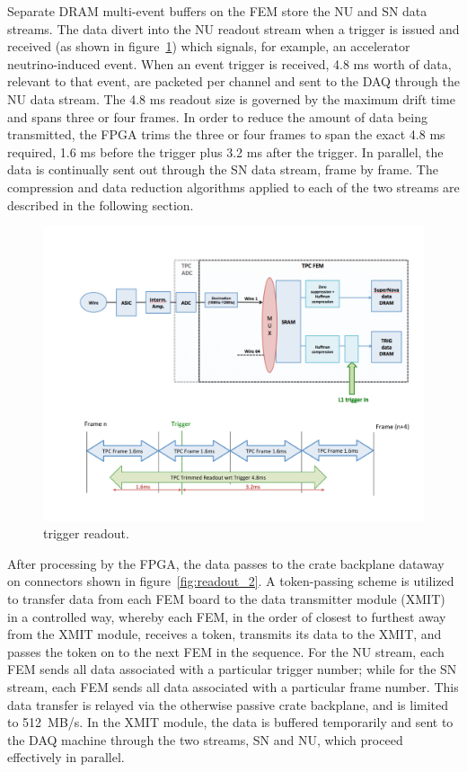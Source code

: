 Separate DRAM multi-event buffers on the FEM store the NU and SN data streams. The data divert into the NU readout stream when a trigger is issued and received (as shown in figure~\ref{fig:readout_4}) which signals, for example, an accelerator neutrino-induced event. When an event trigger is received, 4.8 ms worth of data, relevant to that event, are packeted per channel and sent to the DAQ through the NU data stream. The 4.8 ms readout size is governed by the maximum drift time and spans three or four frames. In order to reduce the amount of data being transmitted, the FPGA trims the three or four frames to span the exact 4.8 ms required, 1.6 ms before the trigger plus 3.2 ms after the trigger. In parallel, the data is continually sent out through the SN data stream, frame by frame. The compression and data reduction algorithms applied to each of the two streams are described in the following section.
 
\begin{figure}
\centering
\includegraphics[width=0.8\linewidth]{./figures/readout_4.pdf}%
\caption{\label{fig:readout_4}\lartpc trigger readout.}
\end{figure}

After processing by the FPGA, the data passes to the crate backplane dataway on connectors shown in figure~\ref{fig:readout_2}. A token-passing scheme is utilized to transfer data from each FEM board to the data transmitter module (XMIT) in a controlled way, whereby each FEM, in the order of closest to furthest away from the XMIT module, receives a token, transmits its data to the XMIT, and passes the token on to the next FEM in the sequence. For the NU stream, each FEM sends all data associated with a particular trigger number; while for the SN stream, each FEM sends all data associated with a particular frame number. This data transfer is relayed via the otherwise passive crate backplane, and is limited to 512~MB/s. In the XMIT module, the data is buffered temporarily and sent to the DAQ machine through the two streams, SN and NU, which proceed effectively in parallel.

